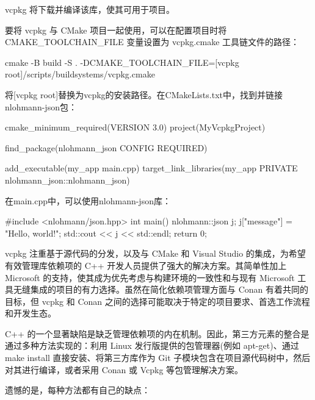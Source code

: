 vcpkg 将下载并编译该库，使其可用于项目。

要将 vcpkg 与 CMake 项目一起使用，可以在配置项目时将 CMAKE\_TOOLCHAIN\_FILE 变量设置为 vcpkg.cmake 工具链文件的路径：

\begin{shell}
cmake -B build -S . -DCMAKE_TOOLCHAIN_FILE=[vcpkg root]/scripts/buildsystems/vcpkg.cmake
\end{shell}

将[vcpkg root]替换为vcpkg的安装路径。在CMakeLists.txt中，找到并链接nlohmann-json包：

\begin{cmake}
cmake_minimum_required(VERSION 3.0)
project(MyVcpkgProject)

find_package(nlohmann_json CONFIG REQUIRED)

add_executable(my_app main.cpp)
target_link_libraries(my_app PRIVATE nlohmann_json::nlohmann_json)
\end{cmake}

在main.cpp中，可以使用nlohmann-json库：

\begin{cpp}
#include <nlohmann/json.hpp>
int main() {
    nlohmann::json j;
    j["message"] = "Hello, world!";
    std::cout << j << std::endl;
    return 0;
}
\end{cpp}

vcpkg 注重基于源代码的分发，以及与 CMake 和 Visual Studio 的集成，为希望有效管理库依赖项的 C++ 开发人员提供了强大的解决方案。其简单性加上 Microsoft 的支持，使其成为优先考虑与构建环境的一致性和与现有 Microsoft 工具无缝集成的项目的有力选择。虽然在简化依赖项管理方面与 Conan 有着共同的目标，但 vcpkg 和 Conan 之间的选择可能取决于特定的项目要求、首选工作流程和开发生态。


C++ 的一个显著缺陷是缺乏管理依赖项的内在机制。因此，第三方元素的整合是通过多种方法实现的：利用 Linux 发行版提供的包管理器(例如 apt-get)、通过 make install 直接安装、将第三方库作为 Git 子模块包含在项目源代码树中，然后对其进行编译，或者采用 Conan 或 Vcpkg 等包管理解决方案。

遗憾的是，每种方法都有自己的缺点：

